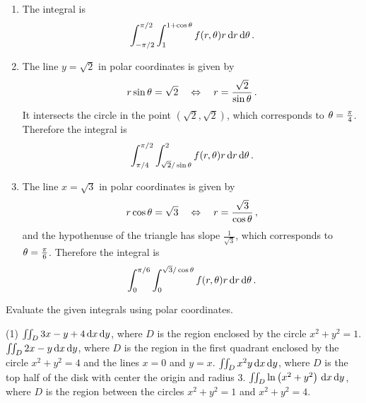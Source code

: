 \begin{solution}
\begin{enumerate}
\item
The integral is
\[
\int_{-\pi/2}^{\pi/2} \int_1^{1+\cos \theta} f(r,\theta) r \,\mathrm{d} r \,\mathrm{d} \theta\,.
\]
\item
The line $y=\sqrt{2}$ in polar coordinates is given by
\[
r \sin \theta = \sqrt{2}
\quad\Leftrightarrow\quad
r = \frac{\sqrt 2}{\sin \theta}\,.
\]
It intersects the circle in the point $\left(\sqrt 2, \sqrt 2\right)$, which corresponds to $\theta = \frac \pi 4$. Therefore the integral is
\[
\int_{\pi/4}^{\pi/2} \int_{\sqrt 2/\sin \theta}^2 f(r,\theta) r \,\mathrm{d} r \,\mathrm{d} \theta\,.
\]
\item
The line $x=\sqrt{3}$ in polar coordinates is given by
\[
r \cos \theta = \sqrt 3
\quad\Leftrightarrow\quad
r = \frac{\sqrt 3}{\cos \theta}\,,
\]
and the hypothenuse of the triangle has slope $\frac{1}{\sqrt 3}$, which corresponds to $\theta=\frac \pi 6$. Therefore the integral is
\[
\int_0^{\pi/6} \int_0^{\sqrt 3/\cos \theta} f(r,\theta) r \,\mathrm{d} r \,\mathrm{d} \theta\,.
\]
\end{enumerate}
\end{solution}

\begin{question}
Evaluate the given integrals using polar coordinates.
\begin{tasks}(1)
\task
$\iint_D 3x-y + 4 \,\mathrm{d} x \,\mathrm{d} y$, where $D$ is the region enclosed by the circle $x^2 + y^2 = 1$.
\task
$\iint_D 2x - y \,\mathrm{d} x \,\mathrm{d} y$, where $D$ is the region in the first quadrant enclosed by the circle $x^2 + y^2 = 4$ and the lines $x=0$ and $y=x$.
\task
$\iint_D x^2 y \,\mathrm{d} x \,\mathrm{d} y$, where $D$ is the top half of the disk with center the origin and radius $3$.
\task
$\iint_D \ln \left(x^2 + y^2\right) \,\mathrm{d} x \,\mathrm{d} y$, where $D$ is the region between the circles $x^2 + y^2 = 1$ and $x^2 + y^2 = 4$.
\end{tasks}
\end{question}

